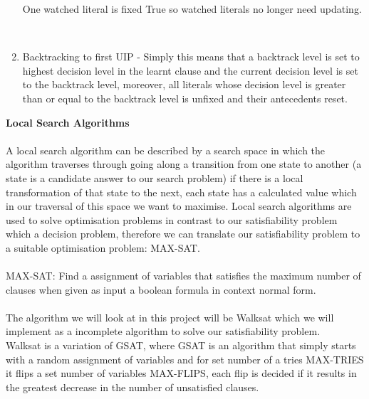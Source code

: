 \documentclass[12pt,a4paper]{article}
\begin{document}
\begin{enumerate}
{\begin{center}
\end{center}
One watched literal is fixed True so watched literals no longer need updating.
\begin{center}
\\
\end{center}
}
\item{Backtracking to first UIP \cite{firstUIPbacktrack} - Simply this means that a backtrack level is set to highest decision level in the learnt clause and the current decision level is set to the backtrack level, moreover, all literals whose decision level is greater than or equal to the backtrack level is unfixed and their antecedents reset.}

\end{enumerate}
\newpage
{\bf Local Search Algorithms}\\\\
A local search algorithm can be described by a search space in which the algorithm traverses through going along a transition from one state to another (a state is a candidate answer to our search problem) if there is a local transformation of that state to the next, each state has a calculated value which in our traversal of this space we want to maximise.
Local search algorithms are used to solve optimisation problems in contrast to our satisfiability problem which a decision problem, therefore we can translate our satisfiability problem to a suitable optimisation problem: MAX-SAT.\\\\
MAX-SAT: Find a assignment of variables that satisfies the maximum number of clauses when given as input a boolean formula in context normal form.\\\\
The algorithm we will look at in this project will be Walksat \cite{WalkSat} which we will implement as a incomplete algorithm to solve our satisfiability problem.\\
Walksat is a variation of GSAT, where GSAT is an algorithm that simply starts with a random assignment of variables and for set number of a tries MAX-TRIES it flips a set number of variables MAX-FLIPS, each flip is decided if it results in the greatest decrease in the number of unsatisfied clauses.\\
\end{document}
